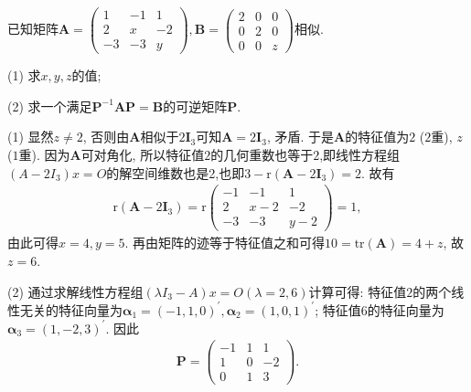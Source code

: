 \documentclass[../../main.tex]{subfiles}
\begin{document}
\begin{example}
已知矩阵\(\boldsymbol{A}=\begin{pmatrix}
1&-1&1\\
2&x&-2\\
-3&-3&y
\end{pmatrix},\boldsymbol{B}=\begin{pmatrix}
2&0&0\\
0&2&0\\
0&0&z
\end{pmatrix}\)相似.

(1) 求\(x,y,z\)的值;

(2) 求一个满足\(\boldsymbol{P}^{-1}\boldsymbol{AP}=\boldsymbol{B}\)的可逆矩阵\(\boldsymbol{P}\). 
\end{example}
\begin{solution}
(1) 显然\(z\neq 2\), 否则由\(\boldsymbol{A}\)相似于\(2\boldsymbol{I}_{3}\)可知\(\boldsymbol{A}=2\boldsymbol{I}_{3}\), 矛盾. 于是\(\boldsymbol{A}\)的特征值为\(2\) (\(2\)重), \(z\) (\(1\)重). 因为\(\boldsymbol{A}\)可对角化, 所以特征值\(2\)的几何重数也等于\(2\),即线性方程组$(A-2I_3)x=O$的解空间维数也是2,也即$3-\mathrm{r}(\boldsymbol{A}-2\boldsymbol{I}_{3})=2$. 故有
\begin{align*}
\mathrm{r}(\boldsymbol{A}-2\boldsymbol{I}_{3})=\mathrm{r}\begin{pmatrix}
-1&-1&1\\
2&x - 2&-2\\
-3&-3&y - 2
\end{pmatrix}=1,
\end{align*}
由此可得\(x = 4,y = 5\). 再由矩阵的迹等于特征值之和可得\(10=\mathrm{tr}(\boldsymbol{A})=4 + z\), 故\(z = 6\).

(2) 通过求解线性方程组$(\lambda I_3-A)x=O(\lambda=2,6)$计算可得: 特征值\(2\)的两个线性无关的特征向量为\(\boldsymbol{\alpha}_{1}=(-1,1,0)^{\prime},\boldsymbol{\alpha}_{2}=(1,0,1)^{\prime}\); 特征值\(6\)的特征向量为\(\boldsymbol{\alpha}_{3}=(1,-2,3)^{\prime}\). 因此
\begin{align*}
\boldsymbol{P}=\begin{pmatrix}
-1&1&1\\
1&0&-2\\
0&1&3
\end{pmatrix}. 
\end{align*}
\end{solution}
\end{document}
